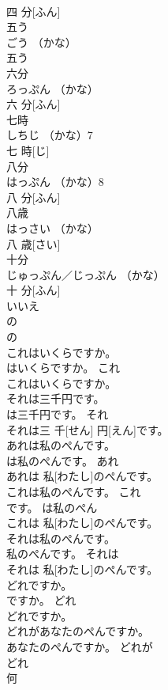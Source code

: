\documentclass[8pt]{extreport}
\begin{document}
\begin{CJK}{UTF8}{min}
\\	四 分[ふん]	
\\	五う	
\\	ごう	（かな）
\\	五う	
\\	六分	
\\	ろっぷん	（かな）
\\	六 分[ふん]	
\\	七時	
\\	しちじ	（かな）7 
\\	七 時[じ]	
\\	八分	
\\	はっぷん	（かな）8 
\\	八 分[ふん]	
\\	八歳	
\\	はっさい	（かな）
\\	八 歳[さい]	
\\	十分	
\\	じゅっぷん／じっぷん	（かな）
\\	十 分[ふん]	
\\	いいえ	
\\	の 
\\	の 
\\	これはいくらですか。	
\\	はいくらですか。	これ	
\\	これはいくらですか。	
\\	それは三千円です。	
\\	は三千円です。	それ	
\\	それは三 千[せん] 円[えん]です。	
\\	あれは私のぺんです。	
\\	は私のぺんです。	あれ	
\\	あれは 私[わたし]のぺんです。	
\\	これは私のぺんです。	これ
\\	です。	は私のぺん	
\\	これは 私[わたし]のぺんです。	
\\	それは私のぺんです。	
\\	私のぺんです。	それは	
\\	それは 私[わたし]のぺんです。	
\\	どれですか。	
\\	ですか。	どれ	
\\	どれですか。	
\\	どれがあなたのぺんですか。	
\\	あなたのぺんですか。	どれが	
\\	どれ 
\\	何 

\end{CJK}
\end{document}
